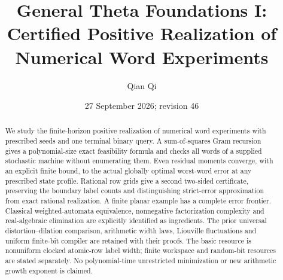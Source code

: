\documentclass[11pt]{amsart}
\title[Certified positive realization]{General Theta Foundations I: Certified Positive Realization of Numerical Word Experiments}
\author{Qian Qi}
\date{27 September 2026; revision 46}
\numberwithin{equation}{section}
\theoremstyle{definition}\newtheorem{definition}[theorem]{Definition}
\begin{document}
\begin{abstract}
We study the finite-horizon positive realization of numerical word
experiments with prescribed seeds and one terminal binary query.
A sum-of-squares Gram recursion gives a polynomial-size exact
feasibility formula and checks all words of a supplied stochastic
machine without enumerating them. Even residual moments converge,
with an explicit finite bound, to the actual globally optimal
worst-word error at any prescribed state profile. Rational row grids
give a second two-sided certificate, preserving the boundary label
counts and distinguishing strict-error approximation from exact
rational realization. A finite planar example has a complete error
frontier. Classical weighted-automata equivalence, nonnegative
factorization complexity and real-algebraic elimination are explicitly
identified as ingredients. The prior universal distortion--dilation
comparison, arithmetic width laws, Liouville fluctuations and uniform
finite-bit compiler are retained with their proofs. The basic resource
is nonuniform clocked atomic-row label width; finite workspace and
random-bit resources are stated separately. No polynomial-time
unrestricted minimization or new arithmetic growth exponent is claimed.
\end{abstract}
\maketitle













\end{document}
